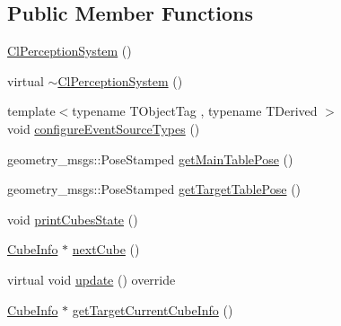 \subsection*{Public Member Functions}
\begin{DoxyCompactItemize}
\item 
\hyperlink{classsm__fetch__six__table__pick__n__sort__1_1_1cl__perception__system_1_1ClPerceptionSystem_a4ead38e217eb7cc0dc216927c92502ba}{Cl\+Perception\+System} ()
\item 
virtual \hyperlink{classsm__fetch__six__table__pick__n__sort__1_1_1cl__perception__system_1_1ClPerceptionSystem_a52124320be2167fb5cbc0f4ac090bf9d}{$\sim$\+Cl\+Perception\+System} ()
\item 
{\footnotesize template$<$typename T\+Object\+Tag , typename T\+Derived $>$ }\\void \hyperlink{classsm__fetch__six__table__pick__n__sort__1_1_1cl__perception__system_1_1ClPerceptionSystem_a99e5387885ad47a047cd0f71fe1bdfd5}{configure\+Event\+Source\+Types} ()
\item 
geometry\+\_\+msgs\+::\+Pose\+Stamped \hyperlink{classsm__fetch__six__table__pick__n__sort__1_1_1cl__perception__system_1_1ClPerceptionSystem_a99ee4544e986811d5c7ff9dcce552eb0}{get\+Main\+Table\+Pose} ()
\item 
geometry\+\_\+msgs\+::\+Pose\+Stamped \hyperlink{classsm__fetch__six__table__pick__n__sort__1_1_1cl__perception__system_1_1ClPerceptionSystem_a61edffc5d1c6332a211324a328f1ba19}{get\+Target\+Table\+Pose} ()
\item 
void \hyperlink{classsm__fetch__six__table__pick__n__sort__1_1_1cl__perception__system_1_1ClPerceptionSystem_af3da61c8b8f5ec1686657a1c6dc18f0b}{print\+Cubes\+State} ()
\item 
\hyperlink{structsm__fetch__six__table__pick__n__sort__1_1_1cl__perception__system_1_1CubeInfo}{Cube\+Info} $\ast$ \hyperlink{classsm__fetch__six__table__pick__n__sort__1_1_1cl__perception__system_1_1ClPerceptionSystem_a5df76b1b2bd090465ac2adf6f7c059d3}{next\+Cube} ()
\item 
virtual void \hyperlink{classsm__fetch__six__table__pick__n__sort__1_1_1cl__perception__system_1_1ClPerceptionSystem_a87292907b7b771d19d91c6de47ea8d1d}{update} () override
\item 
\hyperlink{structsm__fetch__six__table__pick__n__sort__1_1_1cl__perception__system_1_1CubeInfo}{Cube\+Info} $\ast$ \hyperlink{classsm__fetch__six__table__pick__n__sort__1_1_1cl__perception__system_1_1ClPerceptionSystem_a4103ba8479b122c7af34b3b51102c5d5}{get\+Target\+Current\+Cube\+Info} ()

\end{DoxyCompactItemize}
